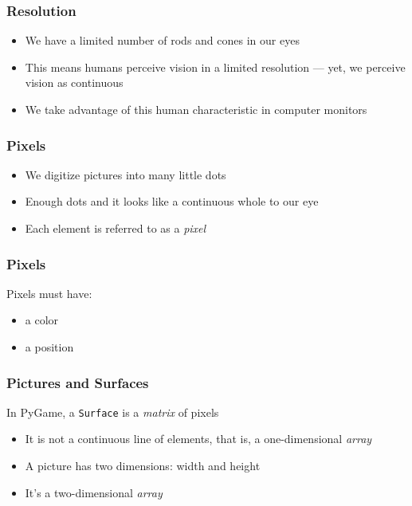 
\begin{frame}
	\frametitle{Resolution}
	\begin{itemize}
		\item We have a limited number of rods and cones in our eyes
		\item This means humans perceive vision in a limited resolution --- yet, we perceive vision as continuous
		\item We take advantage of this human characteristic in computer monitors
	\end{itemize}
\end{frame}


\begin{frame}
	\frametitle{Pixels}
	\begin{itemize}
		\item We digitize pictures into many little dots
		\item Enough dots and it looks like a continuous whole to our eye
		\item Each element is referred to as a \textit{pixel}
	\end{itemize}
\end{frame}

\begin{frame}
	\frametitle{Pixels}
	
	Pixels must have:
	
	\begin{itemize}
		\item a color
		\item a position
	\end{itemize}
\end{frame}

\begin{frame}
	\frametitle{Pictures and Surfaces}
	
	In PyGame, a \texttt{Surface} is a \textit{matrix} of pixels
	
	\begin{itemize}
		\item It is not a continuous line of elements, that is, a one-dimensional \textit{array}
		\item A picture has two dimensions: width and height
		\item It's a two-dimensional \textit{array}
	\end{itemize}
\end{frame}

